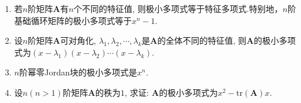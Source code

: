 \documentclass[../../main.tex]{subfiles}
\begin{document}
\begin{proposition}[常见矩阵的极小多项式]\label{proposition:常见矩阵的极小多项式}
\begin{enumerate}[(1)]
\item 若\(n\)阶矩阵\(\boldsymbol{A}\)有\(n\)个不同的特征值, 则极小多项式等于特征多项式.特别地，\(n\)阶基础循环矩阵的极小多项式等于\(x^n - 1\).

\item 设\(n\)阶矩阵\(\boldsymbol{A}\)可对角化, \(\lambda_1,\lambda_2,\cdots,\lambda_k\)是\(\boldsymbol{A}\)的全体不同的特征值, 则\(\boldsymbol{A}\)的极小多项式为$(x - \lambda_1)(x - \lambda_2)\cdots(x - \lambda_k)$. 

\item \(n\)阶幂零Jordan块的极小多项式是\(x^n\).

\item 设\(n(n > 1)\)阶矩阵\(\boldsymbol{A}\)的秩为\(1\), 求证: \(\boldsymbol{A}\)的极小多项式为\(x^2-\mathrm{tr}(\boldsymbol{A})x\).
\end{enumerate}
\end{proposition}
\end{document}
